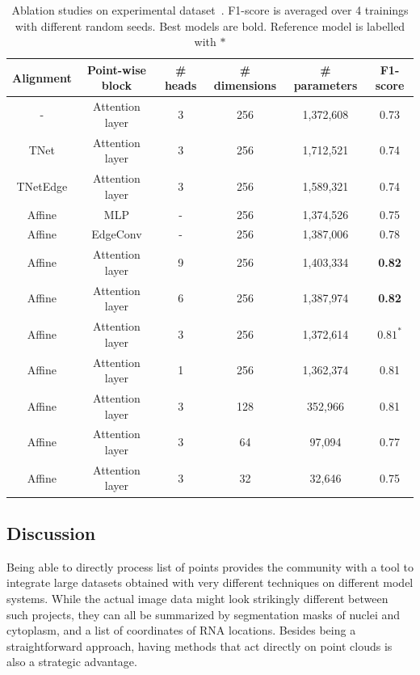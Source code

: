 \begin{table}[h]
	\centering
	\begin{tabular}{| c | c | c | c | c | c |}
		\hline
		Alignment & Point-wise block & \# heads & \# dimensions & \# parameters & F1-score \\
		\hline\hline
		- & Attention layer & 3 & 256 & 1,372,608 & 0.73\\
		TNet & Attention layer & 3 & 256 & 1,712,521 & 0.74\\
		TNetEdge & Attention layer & 3 & 256 & 1,589,321 & 0.74\\
		\hline\hline
		Affine & MLP & - & 256 & 1,374,526 & 0.75\\
		Affine & EdgeConv & - & 256 & 1,387,006 & 0.78\\
		\hline\hline
		Affine & Attention layer & 9 & 256 & 1,403,334 & \textbf{0.82}\\
		Affine & Attention layer & 6 & 256 & 1,387,974 & \textbf{0.82}\\
		Affine & Attention layer & 3 & 256 & 1,372,614 & $0.81^{\ast}$\\
		Affine & Attention layer & 1 & 256 & 1,362,374 & 0.81\\
		\hline\hline
		Affine & Attention layer & 3 & 128 & 352,966 & 0.81\\
		Affine & Attention layer & 3 & 64 & 97,094 & 0.77\\
		Affine & Attention layer & 3 & 32 & 32,646 & 0.75\\
		\hline
	\end{tabular}
	\caption{Ablation studies on experimental dataset~\cite{CHOUAIB_2020}.
	F1-score is averaged over 4 trainings with different random seeds.
	Best models are bold.
	Reference model is labelled with $\ast$}
	\label{table:ablation}
\end{table}

\subsection{Discussion}
\label{subsec:discussion}

Being able to directly process list of points provides the community with a tool to integrate large datasets obtained with very different techniques on different model systems.
While the actual image data might look strikingly different between such projects, they can all be summarized by segmentation masks of nuclei and cytoplasm, and a list of coordinates of \ac{RNA} locations.
Besides being a straightforward approach, having methods that act directly on point clouds is also a strategic advantage.

